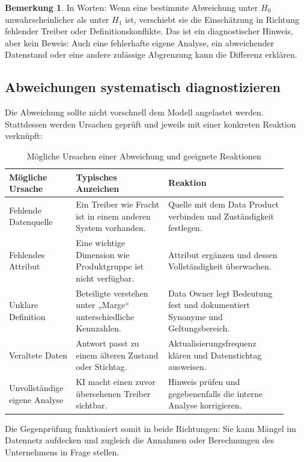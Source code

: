 \documentclass[a4paper,12pt]{article}
\theoremstyle{definition}
\newtheorem{bemerkung}[definition]{Bemerkung}
\begin{document}
\begin{bemerkung}
In Worten: Wenn eine bestimmte Abweichung unter \(H_0\) unwahrscheinlicher als unter \(H_1\) ist, verschiebt sie die Einschätzung in Richtung fehlender Treiber oder Definitionskonflikte. Das ist ein diagnostischer Hinweis, aber kein Beweis: Auch eine fehlerhafte eigene Analyse, ein abweichender Datenstand oder eine andere zulässige Abgrenzung kann die Differenz erklären.
\end{bemerkung}

\subsection{Abweichungen systematisch diagnostizieren}
Die Abweichung sollte nicht vorschnell dem Modell angelastet werden. Stattdessen werden Ursachen geprüft und jeweils mit einer konkreten Reaktion verknüpft:
\begin{table}[htbp]
\centering
\small
\caption{Mögliche Ursachen einer Abweichung und geeignete Reaktionen}
\label{tab:deviation-causes}
\begin{tabular}{p{0.21\linewidth}p{0.31\linewidth}p{0.40\linewidth}}
\toprule
\textbf{Mögliche Ursache} & \textbf{Typisches Anzeichen} & \textbf{Reaktion} \\
\midrule
Fehlende Datenquelle & Ein Treiber wie Fracht ist in einem anderen System vorhanden. & Quelle mit dem Data Product verbinden und Zuständigkeit festlegen. \\
Fehlendes Attribut & Eine wichtige Dimension wie Produktgruppe ist nicht verfügbar. & Attribut ergänzen und dessen Vollständigkeit überwachen. \\
Unklare Definition & Beteiligte verstehen unter „Marge“ unterschiedliche Kennzahlen. & Data Owner legt Bedeutung fest und dokumentiert Synonyme und Geltungsbereich. \\
Veraltete Daten & Antwort passt zu einem älteren Zustand oder Stichtag. & Aktualisierungsfrequenz klären und Datenstichtag ausweisen. \\
Unvollständige eigene Analyse & KI macht einen zuvor übersehenen Treiber sichtbar. & Hinweis prüfen und gegebenenfalls die interne Analyse korrigieren. \\
\bottomrule
\end{tabular}
\end{table}
Die Gegenprüfung funktioniert somit in beide Richtungen: Sie kann Mängel im Datennetz aufdecken und zugleich die Annahmen oder Berechnungen des Unternehmens in Frage stellen.
\end{document}
